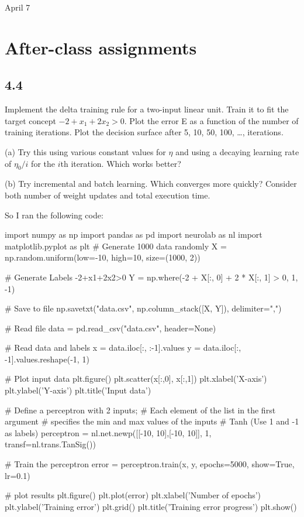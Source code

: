\univlogo

{\Huge April 7}\vspace{5mm}

\section*{After-class assignments}

\subsection*{4.4}

Implement the delta training rule for a two-input linear unit. Train it to fit the target concept $-2 + x_1+ 2x_2 > 0$. Plot the error E as a function of the number of training iterations. Plot the decision surface after 5, 10, 50, 100, \dots , iterations.

(a) Try this using various constant values for $\eta$ and using a decaying learning rate of $\eta_0/i$ for the $i$th iteration. Which works better?

(b) Try incremental and batch learning. Which converges more quickly? Consider both number of weight updates and total execution time.

So I ran the following code:

\begin{python}
import numpy as np
import pandas as pd
import neurolab as nl
import matplotlib.pyplot as plt
# Generate 1000 data randomly
X = np.random.uniform(low=-10, high=10, size=(1000, 2))

# Generate Labels -2+x1+2x2>0
Y = np.where(-2 + X[:, 0] + 2 * X[:, 1] > 0, 1, -1)

# Save to file
np.savetxt("data.csv", np.column_stack([X, Y]), delimiter=",")

# Read file
data = pd.read_csv("data.csv", header=None)

# Read data and labels
x = data.iloc[:, :-1].values
y = data.iloc[:, -1].values.reshape(-1, 1)

# Plot input data
plt.figure()
plt.scatter(x[:,0], x[:,1])
plt.xlabel('X-axis')
plt.ylabel('Y-axis')
plt.title('Input data')

# Define a perceptron with 2 inputs;
# Each element of the list in the first argument 
# specifies the min and max values of the inputs
#  Tanh (Use 1 and -1 as labels)
perceptron = nl.net.newp([[-10, 10],[-10, 10]], 1, transf=nl.trans.TanSig())

# Train the perceptron
error = perceptron.train(x, y, epochs=5000, show=True, lr=0.1)

# plot results
plt.figure()
plt.plot(error)
plt.xlabel('Number of epochs')
plt.ylabel('Training error')
plt.grid()
plt.title('Training error progress')
plt.show()

\end{python}

